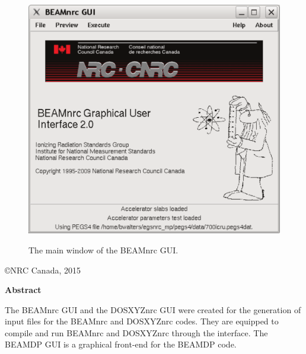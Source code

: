\documentclass[12pt,twoside]{article}
\begin{document}
\begin{figure}[htbp]
\begin{center}
\leavevmode
\includegraphics[width=14cm]{figures/gui_main_window}

The main window of the BEAMnrc GUI.
\end{center}
\end{figure}


\vfill
\begin{center}
\copyright NRC Canada, 2015
\end{center}

\setlength{\baselineskip}{0.5cm}

\newpage

\begin{center}
\begin{Large}
{\bf Abstract}
\end{Large}
\end{center}
The BEAMnrc GUI and the DOSXYZnrc GUI were created
for the generation of input files for the BEAMnrc and DOSXYZnrc codes.
They are equipped to compile and run BEAMnrc and DOSXYZnrc through the
interface.  The
BEAMDP GUI is a graphical front-end for the BEAMDP code.
\end{document}
